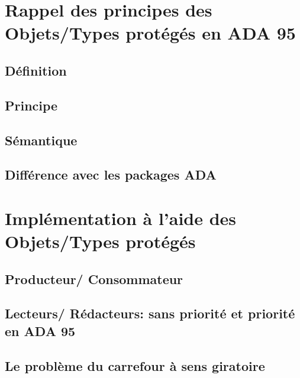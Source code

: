 \documentclass[11pt,a4paper]{article}
\begin{document}
\section{Rappel des principes des Objets/Types protégés en ADA 95}
\subsection{Définition}
\subsection{Principe}
\subsection{Sémantique}
\subsection{Différence avec les packages ADA}
\section{}
\section{Implémentation à l'aide des Objets/Types protégés}
\subsection{Producteur/ Consommateur}
\subsection{Lecteurs/ Rédacteurs: sans priorité et priorité en ADA 95}
\subsection{Le problème du carrefour à sens giratoire}
\end{document}
